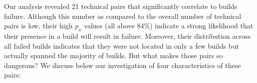 \documentclass{sig-alternate}
\begin{document}




Our analysis revealed 21 technical pairs that significantly correlate to builds failure. 
Although this number as compared to the overall number of technical pairs is low, their high $p_{x}$ values (all above 84\%) indicate a strong likelihood that their presence in a build will result in failure. 
Moreover, their distribution across all failed builds indicates that they were not located in only a few builds but actually spanned the majority of builds. 
But what makes those pairs so dangerous? 
We discuss below our investigation of four characteristics of these pairs:
\end{document}
